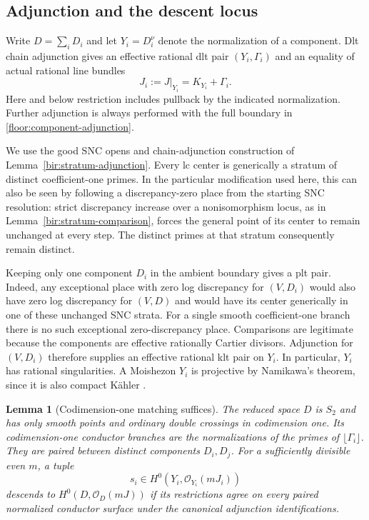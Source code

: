 \documentclass[11pt,letterpaper]{article}
\newcommand{\OO}{\mathcal{O}}
\newtheorem{lemma}[theorem]{Lemma}
\theoremstyle{definition}
\theoremstyle{remark}
\begin{document}
\subsection{Adjunction and the descent locus}

Write $D=\sum_iD_i$ and let $Y_i=D_i^\nu$ denote the normalization of a
component.  Dlt chain adjunction gives an effective rational dlt pair
$(Y_i,\Gamma_i)$ and an equality of actual rational line bundles
\begin{equation}
 \label{floor:component-adjunction}
 J_i:=J|_{Y_i}=K_{Y_i}+\Gamma_i.
\end{equation}
Here and below restriction includes pullback by the indicated
normalization.  Further adjunction is always performed with the full
boundary in \eqref{floor:component-adjunction}.

We use the good SNC opens and chain-adjunction construction of
Lemma~\ref{bir:stratum-adjunction}.  Every lc center is
generically a stratum of distinct coefficient-one primes.  In the
particular modification used here, this can also be seen by following a
discrepancy-zero place from the starting SNC resolution: strict
discrepancy increase over a nonisomorphism locus, as in
Lemma~\ref{bir:stratum-comparison}, forces the general point
of its center to remain unchanged at every step.  The distinct primes at
that stratum consequently remain distinct.

Keeping only one component $D_i$ in the ambient boundary gives a plt
pair.  Indeed, any exceptional place with zero log discrepancy for
$(V,D_i)$ would also have zero log discrepancy for $(V,D)$ and would
have its center generically in one of these unchanged SNC strata.  For a
single smooth coefficient-one branch there is no such exceptional
zero-discrepancy place.  Comparisons are legitimate because the
components are effective rationally Cartier divisors.  Adjunction for
$(V,D_i)$ therefore supplies an effective rational klt pair on $Y_i$.
In particular, $Y_i$ has rational singularities.  A Moishezon $Y_i$ is
projective by Namikawa's theorem, since it is also compact K\"ahler
\cite{NamikawaProjectivity}.

\begin{lemma}[Codimension-one matching suffices]
\label{floor:descent}
The reduced space $D$ is $S_2$ and has only smooth points and ordinary
double crossings in codimension one.  Its codimension-one conductor
branches are the normalizations of the primes of
$\lfloor\Gamma_i\rfloor$.  They are paired between distinct components
$D_i,D_j$.  For a sufficiently divisible even $m$, a tuple
\[
 s_i\in H^0(Y_i,\OO_{Y_i}(mJ_i))
\]
descends to $H^0(D,\OO_D(mJ))$ if its restrictions agree on every paired
normalized conductor surface under the canonical adjunction
identifications.
\end{lemma}
\end{document}

